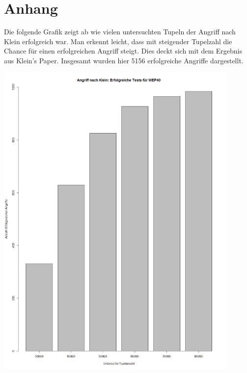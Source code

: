 \documentclass[10pt,a4paper]{article}
\begin{document}
\section{Anhang}
Die folgende Grafik zeigt ab wie vielen untersuchten Tupeln der Angriff nach Klein erfolgreich war. Man erkennt leicht, dass mit steigender Tupelzahl die Chance für einen erfolgreichen Angriff steigt. Dies deckt sich mit dem Ergebnis aus Klein's Paper. Insgesamt wurden hier 5156 erfolgreiche Angriffe dargestellt.
\begin{center}
\includegraphics[width=0.9\textwidth]{img/wep40_erfolg.png}
\end{center}
\label{fig:wep40_suc}
\newpage
\end{document}
